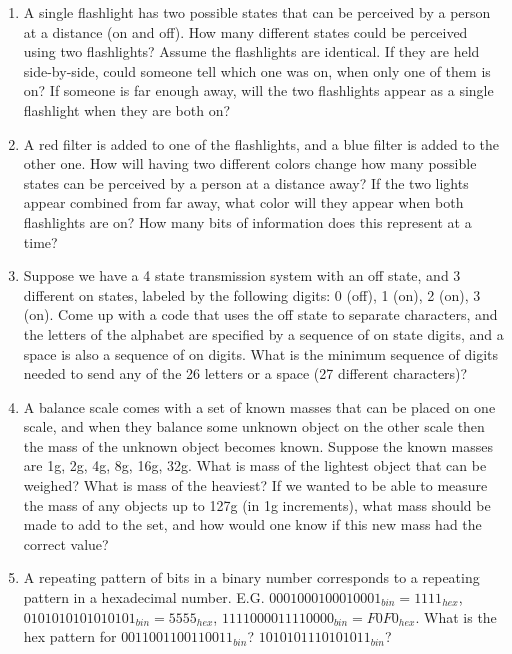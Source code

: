 \begin{enumerate}
	\item A single flashlight has two possible states that can be perceived by a person at a distance (on and off). How many different states could be perceived using two flashlights? Assume the flashlights are identical. If they are held side-by-side, could someone tell which one was on, when only one of them is on? If someone is far enough away, will the two flashlights appear as a single flashlight when they are both on?
	
	\item A red filter is added to one of the flashlights, and a blue filter is added to the other one. How will having two different colors change how many possible states can be perceived by a person at a distance away? If the two lights appear combined from far away, what color will they appear when both flashlights are on? How many bits of information does this represent at a time?
	
	\item Suppose we have a 4 state transmission system with an off state, and 3 different on states, labeled by the following digits: 0 (off), 1 (on), 2 (on), 3 (on). Come up with a code that uses the off state to separate characters, and the letters of the alphabet are specified by a sequence of on state digits, and a space is also a sequence of on digits. What is the minimum sequence of digits needed to send any of the 26 letters or a space (27 different characters)?
	
	\item A balance scale comes with a set of known masses that can be placed on one scale, and when they balance some unknown object on the other scale then the mass of the unknown object becomes known. Suppose the known masses are 1g, 2g, 4g, 8g, 16g, 32g. What is mass of the lightest object that can be weighed? What is mass of the heaviest? If we wanted to be able to measure the mass of any objects up to 127g (in 1g increments), what mass should be made to add to the set, and how would one know if this new mass had the correct value?
	
	\item A repeating pattern of bits in a binary number corresponds to a repeating pattern in a hexadecimal number. E.G. \(0001000100010001_{bin} = 1111_{hex}\), \(0101010101010101_{bin} = 5555_{hex}\), \(1111000011110000_{bin} = F0F0_{hex}\). What is the hex pattern for \(0011001100110011_{bin}\)? \(1010101110101011_{bin}\)?
	

\end{enumerate}
